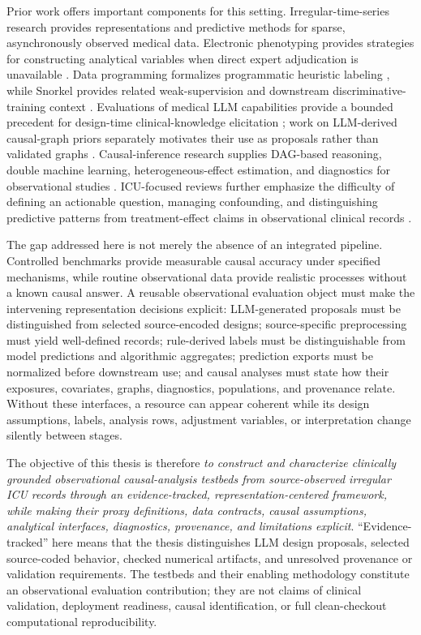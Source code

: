 Prior work offers important components for this setting.  Irregular-time-series research provides representations and predictive methods for sparse, asynchronously observed medical data.  Electronic phenotyping provides strategies for constructing analytical variables when direct expert adjudication is unavailable \cite{banda_2018_electronic_phenotyping}.  Data programming formalizes programmatic heuristic labeling \cite{ratner_et_al_2016_data_programming}, while Snorkel provides related weak-supervision and downstream discriminative-training context \cite{ratner_et_al_2020_snorkel}.  Evaluations of medical LLM capabilities provide a bounded precedent for design-time clinical-knowledge elicitation \cite{singhal_et_al_2023_llm_clinical_knowledge}; work on LLM-derived causal-graph priors separately motivates their use as proposals rather than validated graphs \cite{darvariu_et_al_2024_llm_causal_graph_priors}.  Causal-inference research supplies DAG-based reasoning, double machine learning, heterogeneous-effect estimation, and diagnostics for observational studies \cite{chernozhukov2018dml,wager2018causalforest,athey2019grf}.  ICU-focused reviews further emphasize the difficulty of defining an actionable question, managing confounding, and distinguishing predictive patterns from treatment-effect claims in observational clinical records \cite{smit_2023_causal_inference_icu_scoping_review,bica_2021_individualized_treatment_effects_ehr_ml}.

The gap addressed here is not merely the absence of an integrated pipeline.  Controlled benchmarks provide measurable causal accuracy under specified mechanisms, while routine observational data provide realistic processes without a known causal answer.  A reusable observational evaluation object must make the intervening representation decisions explicit: LLM-generated proposals must be distinguished from selected source-encoded designs; source-specific preprocessing must yield well-defined records; rule-derived labels must be distinguishable from model predictions and algorithmic aggregates; prediction exports must be normalized before downstream use; and causal analyses must state how their exposures, covariates, graphs, diagnostics, populations, and provenance relate.  Without these interfaces, a resource can appear coherent while its design assumptions, labels, analysis rows, adjustment variables, or interpretation change silently between stages.

The objective of this thesis is therefore \emph{to construct and characterize clinically grounded observational causal-analysis testbeds from source-observed irregular ICU records through an evidence-tracked, representation-centered framework, while making their proxy definitions, data contracts, causal assumptions, analytical interfaces, diagnostics, provenance, and limitations explicit}.  ``Evidence-tracked'' here means that the thesis distinguishes LLM design proposals, selected source-coded behavior, checked numerical artifacts, and unresolved provenance or validation requirements.  The testbeds and their enabling methodology constitute an observational evaluation contribution; they are not claims of clinical validation, deployment readiness, causal identification, or full clean-checkout computational reproducibility.


